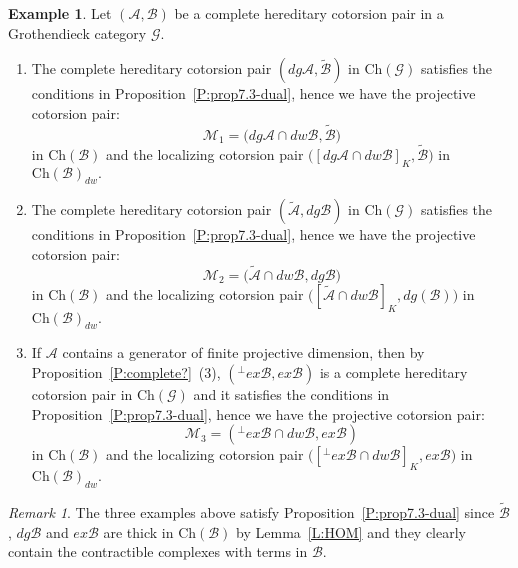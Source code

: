 \documentclass[11pt,a4paper,reqno]{amsart}
\newcommand{\A}{\mathcal{A}}
\newcommand{\B}{\mathcal{B}}
\newcommand{\G}{\mathcal{G}}
\newcommand{\M}{\mathcal{M}}
\newcommand{\Ch}{\mathrm{Ch}}
\theoremstyle{plain}
\theoremstyle{definition}
\newtheorem{expl}[thm]{Example}
\theoremstyle{remark}
\newtheorem{rem}[thm]{Remark}
\begin{document}
\begin{expl}\label{E:examples-proj} Let $(\A, \B)$ be a complete hereditary cotorsion pair in a  Grothendieck category $\G$.
 \begin{enumerate}
%
%
\item The complete hereditary cotorsion pair $(dg \A, \widetilde{\B})$ in $\Ch(\G)$ satisfies the conditions in  Proposition~\ref{P:prop7.3-dual}, hence we have the projective cotorsion pair:
%
 \[\M_1=\Big(dg{\A}\cap dw \B, \widetilde{\B}\Big)\] in $\Ch(\B)$ and the localizing cotorsion pair $\Big([dg{\A}\cap dw \B]_K,  \widetilde{\B}\Big)$ in $\Ch(\B)_{dw}.$
\item The complete hereditary cotorsion pair $(\widetilde{\A}, dg \B)$ in $\Ch(\G)$ satisfies the conditions in  Proposition~\ref{P:prop7.3-dual}, hence we have the projective cotorsion pair:
%
 \[\M_2=\Big(\widetilde{\A}\cap dw \B, dg \B\Big)\] in $\Ch(\B)$ and the localizing cotorsion pair $\Big([\widetilde{\A}\cap dw \B]_K, dg (\B)\Big)$ in $\Ch(\B)_{dw}.$

%
%
%

\item If $\A$ contains a generator of finite projective dimension, then by Proposition~\ref{P:complete?}~(3), $({}^\perp{} ex\B, ex\B)$ is a complete hereditary cotorsion pair in $\Ch(\G)$ and it satisfies the conditions in  Proposition~\ref{P:prop7.3-dual}, hence  we have the projective cotorsion pair:
 \[\M_3=({}^\perp{} ex\B\cap dw \B, ex\B)\] in $\Ch(\B)$ and the localizing cotorsion pair $\Big([{}^\perp{} ex\B\cap dw \B]_K, ex\B\Big)$ in $\Ch(\B)_{dw}.$

 \end{enumerate}
 \end{expl}
 \begin{rem}\label{R:thick-1} The three examples above satisfy Proposition~\ref{P:prop7.3-dual} since $\tilde{\B}$, $dg\B$ and $ex\B$  are thick in $\Ch(\B)$ by Lemma~\ref{L:HOM} and they clearly contain the contractible complexes with terms in $\B$.
 \end{rem}
\end{document}
